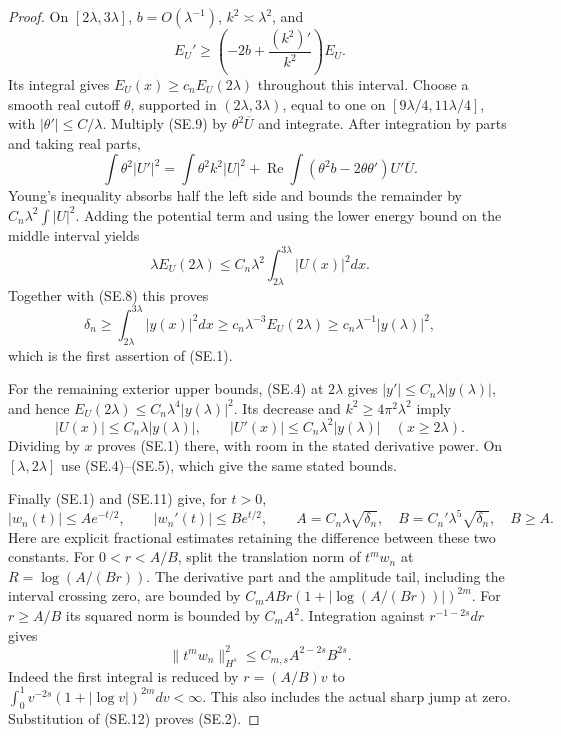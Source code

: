 \begin{proof}
On $[2\lambda,3\lambda]$, $b=O(\lambda^{-1})$,
$k^2\asymp\lambda^2$, and
\[
 E_U'\geq\left(-2b+\frac{(k^2)'}{k^2}\right)E_U.
\]
Its integral gives $E_U(x)\geq c_nE_U(2\lambda)$
throughout this interval.
Choose a smooth real cutoff $\theta$, supported in
$(2\lambda,3\lambda)$, equal to one on
$[9\lambda/4,11\lambda/4]$, with $|\theta'|\leq C/\lambda$.
Multiply (SE.9) by $\theta^2\overline U$ and integrate.
After integration by parts and taking real parts,
\[
 \int\theta^2|U'|^2
  =\int\theta^2k^2|U|^2
    +\operatorname{Re}\int(\theta^2b-2\theta\theta')U'\overline U.
\]
Young's inequality absorbs half the left side and
bounds the remainder by $C_n\lambda^2\int|U|^2$.
Adding the potential term and using the lower energy
bound on the middle interval yields
\[
 \lambda E_U(2\lambda)
       \leq C_n\lambda^2\int_{2\lambda}^{3\lambda}|U(x)|^2dx.
\]
Together with (SE.8) this proves
\[
 \delta_n\geq\int_{2\lambda}^{3\lambda}|y(x)|^2dx
     \geq c_n\lambda^{-3}E_U(2\lambda)
     \geq c_n\lambda^{-1}|y(\lambda)|^2,           \tag{SE.11}
\]
which is the first assertion of (SE.1).

For the remaining exterior upper bounds, (SE.4) at
$2\lambda$ gives $|y'|\leq C_n\lambda|y(\lambda)|$,
and hence $E_U(2\lambda)\leq C_n\lambda^4|y(\lambda)|^2$.
Its decrease and $k^2\geq4\pi^2\lambda^2$ imply
\[
 |U(x)|\leq C_n\lambda|y(\lambda)|,
 \qquad |U'(x)|\leq C_n\lambda^2|y(\lambda)|
                              \quad(x\geq2\lambda).
\]
Dividing by $x$ proves (SE.1) there, with room in
the stated derivative power.  On $[\lambda,2\lambda]$
use (SE.4)--(SE.5), which give the same stated bounds.

Finally (SE.1) and (SE.11) give, for $t>0$,
\[
 |w_n(t)|\leq A e^{-t/2},\qquad
 |w_n'(t)|\leq B e^{t/2},\qquad
 A=C_n\lambda\sqrt{\delta_n},\quad
 B=C_n'\lambda^5\sqrt{\delta_n},\quad B\geq A.   \tag{SE.12}
\]
Here are explicit fractional estimates retaining
the difference between these two constants.
For $0<r<A/B$, split the translation norm of $t^mw_n$
at $R=\log(A/(Br))$.  The derivative part and the
amplitude tail, including the interval crossing zero,
are bounded by
$C_m ABr(1+|\log(A/(Br))|)^{2m}$.
For $r\geq A/B$ its squared norm is bounded by
$C_mA^2$.  Integration against $r^{-1-2s}dr$ gives
\[
 \|t^mw_n\|_{H^s}^2
              \leq C_{m,s}A^{2-2s}B^{2s}.
\]
Indeed the first integral is reduced by $r=(A/B)v$
to $\int_0^1v^{-2s}(1+|\log v|)^{2m}dv<\infty$.
This also includes the actual sharp jump at zero.
Substitution of (SE.12) proves (SE.2).
\end{proof}

